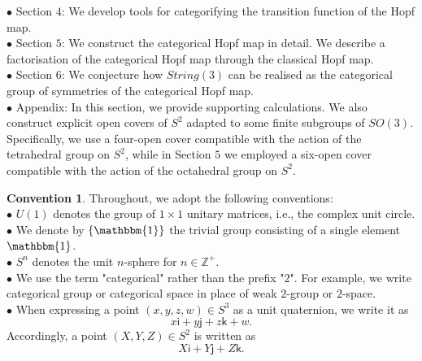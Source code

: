 \documentclass{article}
\theoremstyle{plain}
\theoremstyle{definition}
\newtheorem{conv}[thm]{Convention}
\begin{document}
$\bullet$ Section $4$:  We develop tools for categorifying the transition function of the Hopf map. \\
$\bullet$ Section $5$: We construct the categorical Hopf map in detail. We describe a factorisation of the categorical Hopf map through the classical Hopf map. \\
$\bullet$ Section $6$: We conjecture how $String(3)$ can be realised as the categorical group of symmetries of the categorical Hopf map. \\
$\bullet$ Appendix: In this section, we provide supporting calculations. We also construct explicit open covers of $S^2$ adapted to some finite subgroups of $SO(3)$. Specifically, we use a four-open cover compatible with the action of the tetrahedral group on $S^2$, while in Section $5$ we employed a six-open cover compatible with the action of the octahedral group on $S^2$.
\begin{conv}
Throughout, we adopt the following conventions: \\
$\bullet$ $U(1)$ denotes the group of $1 \times 1$ unitary matrices, i.e., the complex unit circle. \\
$\bullet$ We denote by $\left\{\mathbbm{1}\right\}$ the trivial group consisting of a single element $\mathbbm{1}$. \\
$\bullet$ $S^n$ denotes the unit $n$-sphere for $n \in \mathbb{Z}^+$. \\
$\bullet$ We use the term "categorical" rather than the prefix "$2$". For example, we write categorical group or categorical space in place of weak $2$-group or $2$-space. \\
$\bullet$ When expressing a point $(x,y,z,w) \in S^3$ as a unit quaternion, we write it as
\[
x\mathsf{i}+y\mathsf{j}+z\mathsf{k}+w.
\]
Accordingly, a point $(X,Y,Z) \in S^2$ is written as
\[
X\mathsf{i}+Y\mathsf{j}+Z\mathsf{k}.
\]
\end{conv}


%
\newpage
{}
\end{document}
